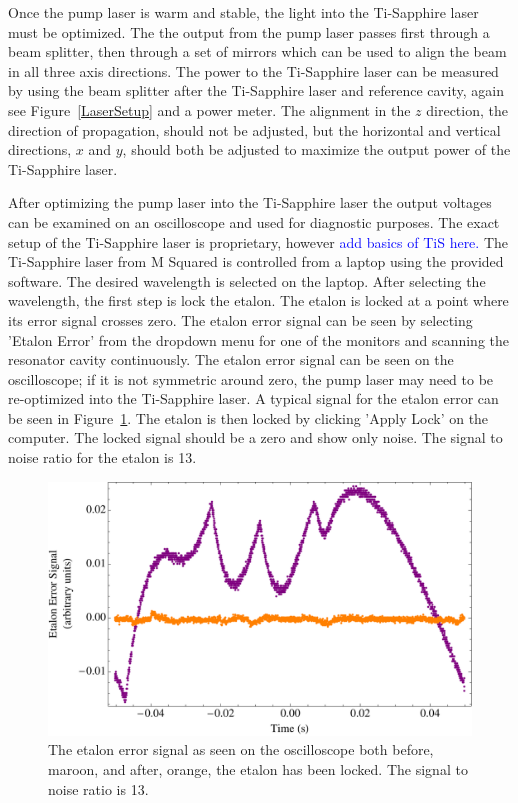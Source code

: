 \documentclass[prb,preprint]{revtex4-1}
\begin{document}
Once the pump laser is warm and stable, the light into the Ti-Sapphire laser must be optimized. The the output from the pump laser passes first through a beam splitter, then through a set of mirrors which can be used to align the beam in all three axis directions. The power to the Ti-Sapphire laser can be measured by using the beam splitter after the Ti-Sapphire laser and reference cavity, again see Figure~\ref{LaserSetup} and a power meter. The alignment in the $z$ direction, the direction of propagation, should not be adjusted, but the horizontal and vertical directions, $x$ and $y$, should both be adjusted to maximize the output power of the Ti-Sapphire laser. 

After optimizing the pump laser into the Ti-Sapphire laser the output voltages can be examined on an oscilloscope and used for diagnostic purposes. The exact setup of the Ti-Sapphire laser is proprietary, however \textcolor{blue}{add basics of TiS here.} The Ti-Sapphire laser from M Squared is controlled from a laptop using the provided software. The desired wavelength is selected on the laptop. After selecting the wavelength, the first step is lock the etalon. The etalon is locked at a point where its error signal crosses zero. The etalon error signal can be seen by selecting 'Etalon Error' from the dropdown menu for one of the monitors and scanning the resonator cavity continuously. The etalon error signal can be seen on the oscilloscope; if it is not symmetric around zero, the pump laser may need to be re-optimized into the Ti-Sapphire laser. A typical signal for the etalon error can be seen in Figure~\ref{EtalonError}. The etalon is then locked by clicking 'Apply Lock' on the computer. The locked signal should be a zero and show only noise. The signal to noise ratio for the etalon is 13.

\begin{figure}[h!]
\centering
\includegraphics[width=6in]{EtalonError.pdf}
\caption{The etalon error signal as seen on the oscilloscope both before, maroon, and after, orange, the etalon has been locked. The signal to noise ratio is 13.}
\label{EtalonError}
\end{figure}
\end{document}
